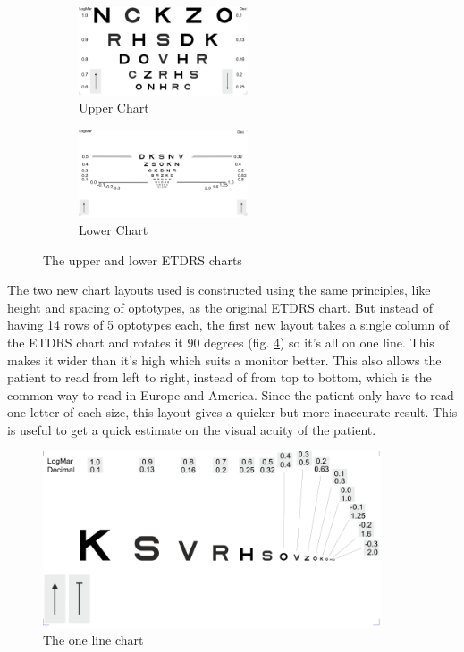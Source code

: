 \documentclass[12pt,a4paper,notitlepage]{report}
\begin{document}
\begin{figure}[ht!]
\centering
\begin{subfigure}{.5\textwidth}
  \centering
  \includegraphics[width=50mm]{images/etdrs_top.png}
  \caption{Upper Chart}
  \label{fig:etdrs_upper}
\end{subfigure}%
\begin{subfigure}{.5\textwidth}
  \centering
  \includegraphics[width=50mm]{images/etdrs_bottom.png}
  \caption{Lower Chart}
  \label{fig:etdrs_lower}
\end{subfigure}
\caption{The upper and lower ETDRS charts}
\label{fig:etdrs_upper_lower}
\end{figure}

The two new chart layouts used is constructed using the same principles, like height and spacing of optotypes, as the original ETDRS chart. But instead of having 14 rows of 5 optotypes each, the first new layout takes a single column of the ETDRS chart and rotates it 90 degrees (fig. \ref{fig:etdrs_one_line}) so it's all on one line. This makes it wider than it's high which suits a monitor better. This also allows the patient to read from left to right, instead of from top to bottom, which is the common way to read in Europe and America. Since the patient only have to read one letter of each size, this layout gives a quicker but more inaccurate result. This is useful to get a quick estimate on the visual acuity of the patient.

\begin{figure}[ht!]
\centering
\includegraphics[width=100mm]{images/etdrs_one_line.png}
\caption{The one line chart}
\label{fig:etdrs_one_line}
\end{figure}
\end{document}
